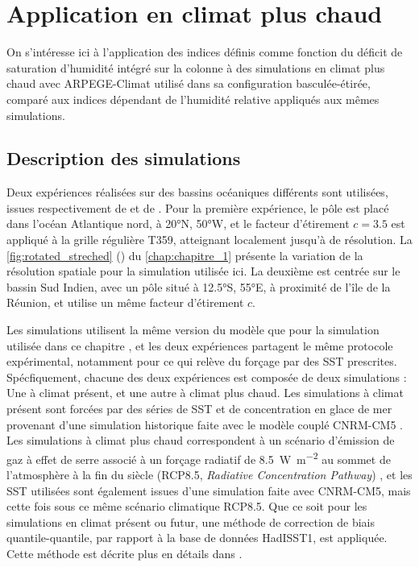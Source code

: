 \documentclass[../main.tex]{subfiles}
\begin{document}
\section{Application en climat plus chaud}

On s'intéresse ici à l'application des indices définis comme fonction du déficit de saturation d'humidité intégré sur la colonne à des simulations en climat
plus chaud avec ARPEGE-Climat utilisé dans sa configuration basculée-étirée, comparé aux indices dépendant de l'humidité relative appliqués aux mêmes
simulations.

\subsection{Description des simulations}

Deux expériences réalisées sur des bassins océaniques différents sont utilisées, issues respectivement de \textcite{chauvin_future_2020} et de
\textcite{cattiaux_projected_2020}. Pour la première expérience, le pôle est placé dans l'océan Atlantique nord, à \ang{20}N, \ang{50}W, et le facteur
d'étirement $c=\num{3.5}$ est appliqué à la grille régulière T359, atteignant localement jusqu'à  de résolution. La \cref{fig:rotated_streched}
() du \cref{chap:chapitre_1} présente la variation de la résolution spatiale pour la simulation utilisée ici. La deuxième est
centrée sur le bassin Sud Indien, avec un pôle situé à \ang{12.5}S, \ang{55}E, à proximité de l'île de la Réunion, et utilise un même facteur d'étirement $c$. 

Les simulations utilisent la même version du modèle que pour la simulation utilisée dans ce chapitre \parencite{voldoire_evaluation_2019}, et les deux
expériences partagent le même protocole expérimental, notamment pour ce qui relève du forçage par des SST prescrites. Spécfiquement, chacune des deux
expériences est composée de deux simulations : Une à climat présent, et une autre à climat plus chaud. Les simulations à climat présent sont forcées par des
séries de SST et de concentration en glace de mer provenant d'une simulation historique faite avec le modèle couplé CNRM-CM5 \parencite{voldoire_cnrmcm5_2013}.
Les simulations à climat plus chaud correspondent à un scénario d'émission de gaz à effet de serre associé à un forçage radiatif de
\SI{8.5}{\watt\per\meter\squared} au sommet de l'atmosphère à la fin du siècle (RCP8.5, \textit{Radiative Concentration Pathway})
\parencite{christensen_climate_2013}, et les SST utilisées sont également issues d'une simulation faite avec CNRM-CM5, mais cette fois sous ce même scénario
climatique RCP8.5. Que ce soit pour les simulations en climat présent ou futur, une méthode de correction de biais quantile-quantile, par rapport à la base de
données HadISST1, est appliquée. Cette méthode est décrite plus en détails dans \textcite{chauvin_future_2020}.
\end{document}
